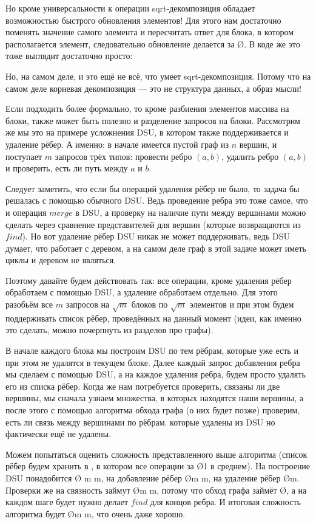 Но кроме универсальности к операции sqrt-декомпозиция обладает возможностью быстрого обновления элементов! Для этого нам достаточно поменять значение самого элемента и пересчитать ответ для блока, в котором располагается элемент, следовательно обновление делается за \O{}. В коде же это тоже выглядит достаточно просто:

\nocode

Но, на самом деле, и это ещё не всё, что умеет sqrt-декомпозиция. Потому что на самом деле корневая декомпозиция — это не структура данных, а образ мысли!

Если подходить более формально, то кроме разбиения элементов массива на блоки, также может быть полезно и разделение запросов на блоки. Рассмотрим же мы это на примере усложнения DSU, в котором также поддерживается и удаление рёбер. А именно: в начале имеется пустой граф из $n$ вершин, и поступает $m$ запросов трёх типов: провести ребро $(a, b)$, удалить ребро $(a, b)$ и проверить, есть ли путь между $a$ и $b$.

Следует заметить, что если бы операций удаления рёбер не было, то задача бы решалась с помощью обычного DSU. Ведь проведение ребра это тоже самое, что и операция $merge$ в DSU, а проверку на наличие пути между вершинами можно сделать через сравнение представителей для вершин (которые возвращаются из $find$). Но вот удаление рёбер DSU никак не может поддерживать, ведь DSU думает, что работает с деревом, а на самом деле граф в этой задаче может иметь циклы и деревом не являться.

Поэтому давайте будем действовать так: все операции, кроме удаления рёбер обработаем с помощью DSU, а удаление обработаем отдельно. Для этого разобьём все $m$ запросов на $\sqrt{m}$ блоков по $\sqrt{m}$ элементов и при этом будем поддерживать список рёбер, проведённых на данный момент (идеи, как именно это сделать, можно почерпнуть из разделов про графы).

В начале каждого блока мы построим DSU по тем рёбрам, которые уже есть и при этом не удалятся в текущем блоке. Далее каждый запрос добавления ребра мы сделаем с помощью DSU, а на каждое удаления ребра, будем просто удалять его из списка рёбер. Когда же нам потребуется проверить, связаны ли две вершины, мы сначала узнаем множества, в которых находятся наши вершины, а после этого с помощью алгоритма обхода графа (о них будет позже) проверим, есть ли связь между вершинами по рёбрам. которые удалены из DSU но фактически ещё не удалены.

Можем попытаться оценить сложность представленного выше алгоритма (список рёбер будем хранить в , в котором все операции за \O{1} в среднем). На построение DSU понадобится \O{ \cdot m \ac{m}}, на добавление рёбер \O{m \ac{m}}, на удаление рёбер \O{m}. Проверки же на связность займут \O{m  \ac{m}}, потому что обход графа займёт \O{}, а на каждом шаге будет нужно делает $find$ для концов ребра. И итоговая сложность алгоритма будет \O{m  \ac{m}}, что очень даже хорошо.
